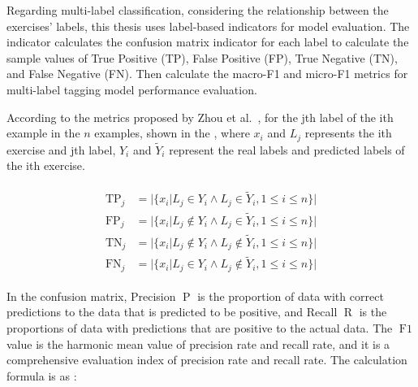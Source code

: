 
Regarding multi-label classification, considering the relationship between the exercises' labels, this thesis uses label-based indicators for model evaluation. The indicator calculates the confusion matrix indicator for each label to calculate the sample values of True Positive (TP), False Positive (FP), True Negative (TN), and False Negative (FN). Then calculate the macro-F1 and micro-F1 metrics for multi-label tagging model performance evaluation.

According to the metrics proposed by Zhou et al.~\cite{zhang2013review}, for the jth label of the ith example in the \(n\) examples, shown in the \eqname{\ref{fml:mlcm}}, where \(x_i\) and \(L_j\) represents the ith exercise and jth label, \(Y_i\) and \(\tilde{Y}_i\) represent the real labels and predicted labels of the ith exercise.

\begin{align}\label{fml:mlcm}
    \begin{split}
        \operatorname{TP}_j & =| \{x_i| L_j\in Y_{i}\wedge L_j \in \tilde{Y}_i , 1\leq i \leq n\}|       \\
        \operatorname{FP}_j & =| \{x_i| L_j\notin Y_{i}\wedge L_j \in \tilde{Y}_i , 1\leq i \leq n\}|    \\
        \operatorname{TN}_j & =| \{x_i| L_j\notin Y_{i}\wedge L_j \notin \tilde{Y}_i , 1\leq i \leq n\}| \\
        \operatorname{FN}_j & =| \{x_i| L_j\in Y_{i}\wedge L_j \notin \tilde{Y}_i , 1\leq i \leq n\}|
    \end{split}
\end{align}




In the confusion matrix, Precision \(\operatorname{P}\) is the proportion of data with correct predictions to the data that is predicted to be positive, and Recall \(\operatorname{R}\) is the proportions of data with predictions that are positive to the actual data. The \(\operatorname{F1}\) value is the harmonic mean value of precision rate and recall rate, and it is a comprehensive evaluation index of precision rate and recall rate. The calculation formula is as \eqname{\ref{fml:f1score}}:

